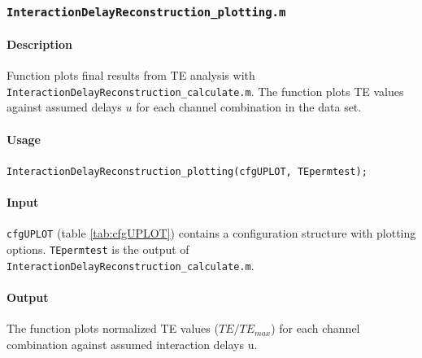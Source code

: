 \documentclass[a4paper,10pt]{article}
\begin{document}
\subsubsection{\texttt{InteractionDelayReconstruction\_plotting.m}} 

\paragraph*{Description} Function plots final results from TE analysis with \verb&InteractionDelayReconstruction_calculate.m&. The function plots TE values against assumed delays $u$ for each channel combination in the data set. 

\paragraph*{Usage} \texttt{InteractionDelayReconstruction\_plotting(cfgUPLOT, TEpermtest);}

\paragraph*{Input} \texttt{cfgUPLOT} (table \ref{tab:cfgUPLOT}) contains a configuration structure with plotting options. \texttt{TEpermtest} is the output of \texttt{InteractionDelayReconstruction\_calculate.m}.

\paragraph*{Output} The function plots normalized TE values ($TE/TE_{max}$) for each channel combination against assumed interaction delays u. 

\end{document}
